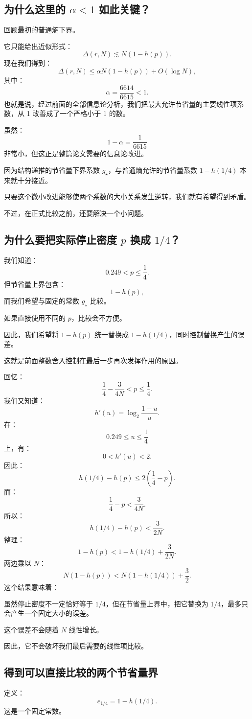 \documentclass[UTF8,11pt]{ctexart}
\begin{document}
\subsection{为什么这里的 $\alpha<1$ 如此关键？}
回顾最初的普通熵下界。

它只能给出近似形式：
\[\Delta(r,N)\lesssim N(1-h(p)).\]
现在我们得到：
\[\Delta(r,N)\le\alpha N(1-h(p))+O(\log N),\]
其中：
\[\alpha=\frac{6614}{6615}<1.\]
也就是说，经过前面的全部信息论分析，我们把最大允许节省量的主要线性项系数，从 1 改善成了一个严格小于 1 的数。

虽然：
\[1-\alpha=\frac1{6615}\]
非常小，但这正是整篇论文需要的信息论改进。

因为结构递推的节省量下界系数 $g_\star$，与普通熵允许的节省量系数 $1-h(1/4)$ 本来就十分接近。

只要这个微小改进能够使两个系数的大小关系发生逆转，我们就有希望得到矛盾。

不过，在正式比较之前，还要解决一个小问题。

\subsection{为什么要把实际停止密度 $p$ 换成 $1/4$？}
我们知道：
\[0.249<p\le\frac14.\]
但节省量上界包含：
\[1-h(p),\]
而我们希望与固定的常数 $g_\star$ 比较。

如果直接使用不同的 $p$，比较会不方便。

因此，我们希望将 $1-h(p)$ 统一替换成 $1-h(1/4)$，同时控制替换产生的误差。

这就是前面整数舍入控制在最后一步再次发挥作用的原因。

回忆：
\[\frac14-\frac3{4N}<p\le\frac14.\]
我们又知道：
\[h'(u)=\log_2\frac{1-u}{u}.\]
在：
\[0.249\le u\le\frac14\]
上，有：
\[0<h'(u)<2.\]
因此：
\[h(1/4)-h(p)\le2\left(\frac14-p\right).\]
而：
\[\frac14-p<\frac3{4N}.\]
所以：
\[h(1/4)-h(p)<\frac3{2N}.\]
整理：
\[1-h(p)<1-h(1/4)+\frac3{2N}.\]
两边乘以 $N$：
\begin{equation}\boxed{N(1-h(p))<N(1-h(1/4))+\frac32.}\tag{50}\end{equation}
这个结果意味着：

虽然停止密度不一定恰好等于 $1/4$，但在节省量上界中，把它替换为 $1/4$，最多只会产生一个固定大小的误差。

这个误差不会随着 $N$ 线性增长。

因此，它不会破坏我们最后需要的线性项比较。

\subsection{得到可以直接比较的两个节省量界}
定义：
\begin{equation}\boxed{e_{1/4}=1-h(1/4).}\tag{51}\end{equation}
这是一个固定常数。
\end{document}
